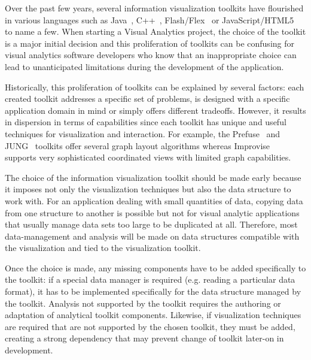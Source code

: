 
Over the past few years, several information visualization toolkits
have flourished in various languages such as Java~\cite{InfoVis,
  Prefuse, jung2003, Improvise,Discovery2}, C++~\cite{Tulip,ADVIZOR},
Flash/Flex~\cite{flare,Axiis} or
JavaScript/HTML5~\cite{thejit,Protovis} to name a few.  When starting
a Visual Analytics project, the choice of the toolkit is a major
initial decision and this proliferation of toolkits can be confusing
for visual analytics software developers who know that an
inappropriate choice can lead to unanticipated limitations during the
development of the application.

Historically, this proliferation of toolkits can be explained by
several factors: each created toolkit addresses a specific set of
problems, is designed with a specific application domain in mind or
simply offers different tradeoffs.  However, it results in dispersion
in terms of capabilities since each toolkit has unique and useful
techniques for visualization and interaction.  For example, the
Prefuse~\cite{Prefuse} and JUNG~\cite{jung2003} toolkits offer several
graph layout algorithms whereas Improvise~\cite{Improvise} supports
very sophisticated coordinated views with limited graph capabilities.

The choice of the information visualization toolkit should be made
early because it imposes not only the visualization techniques but
also the data structure to work with.  For an application dealing with
small quantities of data, copying data from one structure to another
is possible but not for visual analytic applications that usually
manage data sets too large to be duplicated at all.  Therefore, most
data-management and analysis will be made on data structures
compatible with the visualization and tied to the visualization
toolkit.


Once the choice is made, any missing components have to be
added specifically to the toolkit: if a special data manager is
required (e.g. reading a particular data format), it has to be
implemented specifically for the data structure managed by the
toolkit. Analysis not supported by the toolkit requires the authoring
or adaptation of analytical toolkit components. Likewise, if visualization
techniques are required that are not supported by the chosen toolkit,
they must be added, creating a strong dependency that may prevent
change of toolkit later-on in development.

